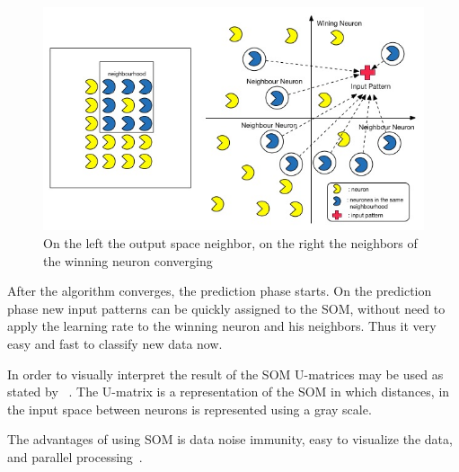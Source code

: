 \begin{figure}
  \begin{center}
    \includegraphics[width=12cm]{images/5_neighbours_converge.jpg}
  \end{center}
  \caption{ On the left the output space neighbor, on the right the neighbors of the winning neuron converging }
  \label{fig:5_neighbours_converge}
\end{figure}

After the algorithm converges, the prediction phase starts. On the prediction phase new input patterns can be quickly assigned to the SOM, without need to apply the learning rate to the winning neuron and his neighbors. Thus it very easy and fast to classify new data now.

In order to visually interpret the result of the SOM U-matrices may be used as stated by ~\citep{Bacao2005}. The U-matrix is a representation of the SOM in which distances, in the input space between neurons is represented using a gray scale.

The advantages of using SOM is data noise immunity, easy to visualize the data, and parallel processing~\cite{Liu2012b}.
 
